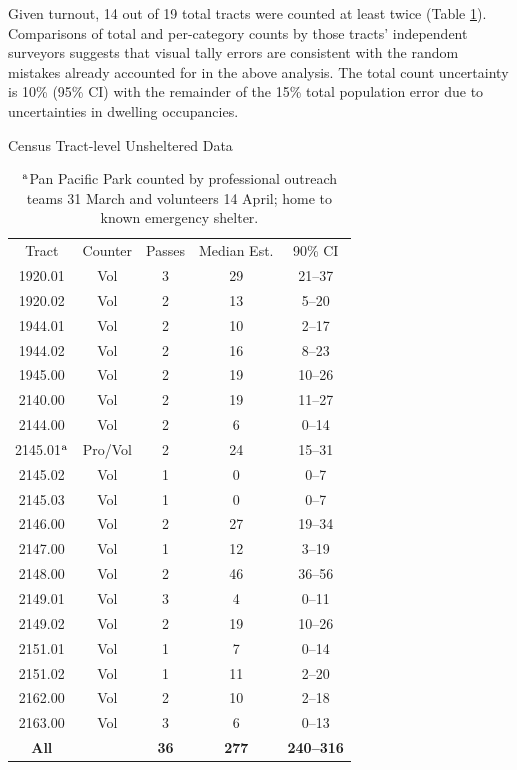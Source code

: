 \documentclass[11pt]{article}
\begin{document}
Given turnout, 14 out of 19 total tracts were counted at least twice (Table \ref{tbl:allTracts}). 
Comparisons of total and per-category counts by those tracts' independent surveyors
suggests that visual tally errors are consistent with the random mistakes already accounted for 
in the above analysis. The total count uncertainty is 10\% (95\% CI) with the remainder 
of the 15\% total population error due to uncertainties in dwelling occupancies.\\

\begin{table}[b]
\caption{Census Tract-level Unsheltered Data}
\centering
\begin{tabular}{ccccc}
\toprule
Tract & Counter & Passes & Median Est. & 90\% CI \\ \cmidrule{1-5}
1920.01 & Vol & 3 & 29 & 21--37 \\
1920.02 & Vol & 2 & 13 & 5--20 \\
1944.01 & Vol & 2 & 10 & 2--17 \\
1944.02 & Vol & 2 & 16 & 8--23 \\
1945.00 & Vol & 2 & 19 & 10--26 \\
2140.00 & Vol & 2 & 19 & 11--27 \\
2144.00 & Vol & 2 & 6 & 0--14 \\
2145.01$^{\rm a}$ & Pro/Vol & 2 & 24 & 15--31 \\
2145.02 & Vol & 1 & 0 & 0--7 \\
2145.03 & Vol & 1 & 0 & 0--7 \\
2146.00 & Vol & 2 & 27 & 19--34 \\
2147.00 & Vol & 1 & 12 & 3--19 \\
2148.00 & Vol & 2 & 46 & 36--56 \\
2149.01 & Vol & 3 & 4 & 0--11 \\
2149.02 & Vol & 2 & 19 & 10--26 \\
2151.01 & Vol & 1 & 7 & 0--14 \\
2151.02 & Vol & 1 & 11 & 2--20 \\
2162.00 & Vol & 2 & 10 & 2--18 \\
2163.00 & Vol & 3 & 6 & 0--13 \\
\cmidrule{1-5}
{\bf All} & & {\bf 36} & {\bf 277} & {\bf 240--316}
\\ \bottomrule
\end{tabular}
\caption*{$^{\rm a}$Pan Pacific Park counted by professional outreach teams
31 March and volunteers 14 April; home to known emergency shelter.}
\label{tbl:allTracts}
\end{table}
\end{document}
